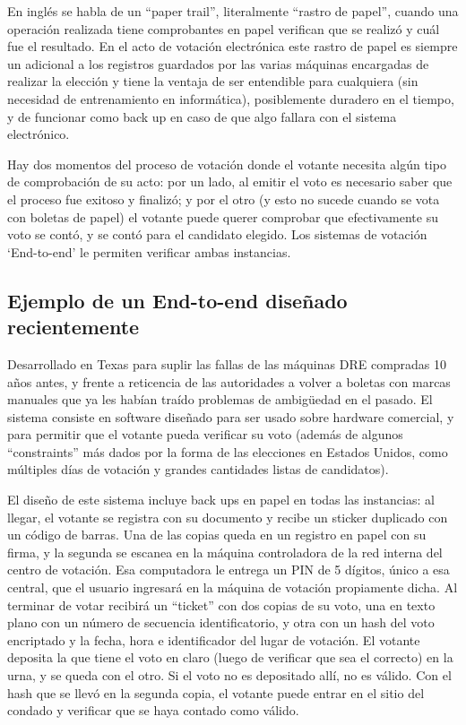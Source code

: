 En inglés se habla de un “paper trail”, literalmente “rastro de papel”, cuando una operación realizada tiene comprobantes en papel verifican que se realizó y cuál fue el resultado. En el acto de votación electrónica este rastro de papel es siempre un adicional a los registros guardados por las varias máquinas encargadas de realizar la elección y tiene la ventaja de ser entendible para cualquiera (sin necesidad de entrenamiento en informática), posiblemente duradero en el tiempo, y de funcionar como back up en caso de que algo fallara con el sistema electrónico.

Hay dos momentos del proceso de votación donde el votante necesita algún tipo de comprobación de su acto: por un lado, al emitir el voto es necesario saber que el proceso fue exitoso y finalizó; y por el otro (y esto no sucede cuando se vota con boletas de papel) el votante puede querer comprobar que efectivamente su voto se contó, y se contó para el candidato elegido. Los sistemas de votación ‘End-to-end’ le permiten verificar ambas instancias.

\subsection{Ejemplo de un End-to-end diseñado recientemente}

Desarrollado en Texas para suplir las fallas de las máquinas DRE compradas 10 años antes, y frente a reticencia de las autoridades a volver a boletas con marcas manuales que ya les habían traído problemas de ambigüedad en el pasado.
El sistema consiste en software diseñado para ser usado sobre hardware comercial, y para permitir que el votante pueda verificar su voto (además de algunos “constraints” más dados por la forma de las elecciones en Estados Unidos, como múltiples días de votación y grandes cantidades listas de candidatos)\cite{star}.

El diseño de este sistema incluye back ups en papel en todas las instancias: al llegar, el votante se registra con su documento y recibe un sticker duplicado con un código de barras. Una de las copias queda en un registro en papel con su firma, y la segunda se escanea en la máquina controladora de la red interna del centro de votación. Esa computadora le entrega un PIN de 5 dígitos, único a esa central, que el usuario ingresará en la máquina de votación propiamente dicha. Al terminar de votar recibirá un “ticket” con dos copias de su voto, una en texto plano con un número de secuencia identificatorio, y otra con un hash del voto encriptado y la fecha, hora e identificador del lugar de votación. El votante deposita la que tiene el voto en claro (luego de verificar que sea el correcto) en la urna, y se queda con el otro. Si el voto no es depositado allí, no es válido. Con el hash que se llevó en la segunda copia, el votante puede entrar en el sitio del condado y verificar que se haya contado como válido.

